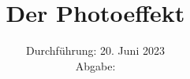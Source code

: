 

\subject{\texorpdfstring{\vspace{2ex}}{}V500\texorpdfstring{\vspace{-2ex}}{}} %
\title{Der Photoeffekt} %
\date{
	Durchführung: 20. Juni 2023 %
	\\ Abgabe:%
}




\maketitle
\thispagestyle{empty}


\tableofcontents
\newpage







\printbibliography{}

\newpage



